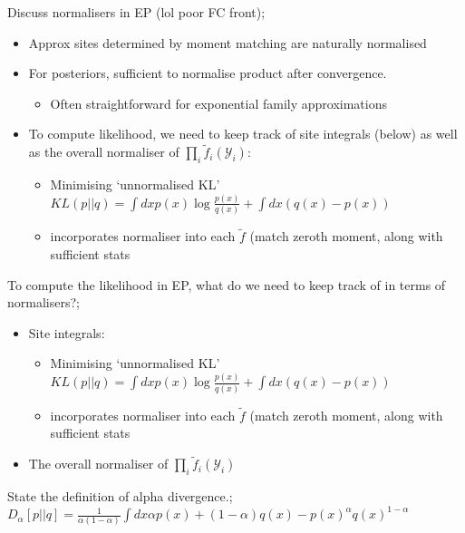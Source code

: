 \documentclass{article}
\begin{document}
Discuss normalisers in EP (lol poor FC front); \begin{itemize}
    \item Approx sites determined by moment matching are naturally normalised
    \item For posteriors, sufficient to normalise product after convergence. \begin{itemize}
        \item Often straightforward for exponential family approximations
    \end{itemize}
    \item To compute likelihood, we need to keep track of site integrals (below) as well as the overall normaliser of $\prod_i\tilde{f}_i(\mathcal{Y}_i)$: \begin{itemize}
        \item Minimising `unnormalised KL' $KL(p||q) = \int dx p(x)\log \frac{p(x)}{q(x)} + \int dx (q(x) - p(x))$ \item incorporates normaliser into each $\tilde{f}$ (match zeroth moment, along with sufficient stats
    \end{itemize}
\end{itemize}

To compute the likelihood in EP, what do we need to keep track of in terms of normalisers?; \begin{itemize}
    \item Site integrals: \begin{itemize}
        \item Minimising `unnormalised KL' $KL(p||q) = \int dx p(x)\log \frac{p(x)}{q(x)} + \int dx (q(x) - p(x))$ \item incorporates normaliser into each $\tilde{f}$ (match zeroth moment, along with sufficient stats
    \end{itemize}
    \item The overall normaliser of $\prod_i\tilde{f}_i(\mathcal{Y}_i)$
\end{itemize}

State the definition of alpha divergence.; $D_{\alpha}[p||q] = \frac{1}{\alpha(1-\alpha)}\int dx \alpha p(x) + (1-\alpha)q(x) - p(x)^{\alpha}q(x)^{1-\alpha}$

\end{document}
